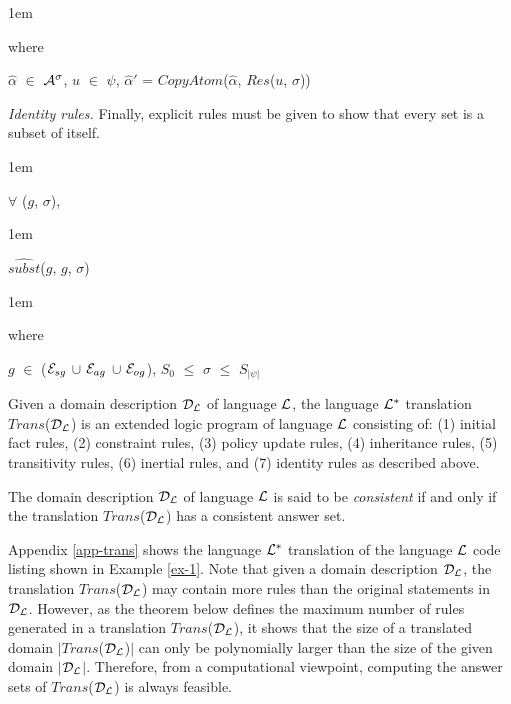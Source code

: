 \documentclass[glov2,twocolumn,final]{svjour2}
\newenvironment{vdefinition}
  {\begin{definition}\hspace{0.1em}}
  {\end{definition}}
\newenvironment{vquote}
  {\begin{list}{}{\leftmargin 1em}\item[]}
  {\end{list}}
\begin{document}
\begin{itemize}
              \begin{vquote}
                where

                $\hat{\alpha}$ $\in$ ${\cal A}^{\sigma}$,
                $u$ $\in$ $\psi$,
                $\hat{\alpha}'$ = $CopyAtom$($\hat{\alpha}$, $Res$($u$, $\sigma$))
              \end{vquote}
            \item
              {\em Identity rules.}
              Finally, explicit rules must be given to show that every set is
              a subset of itself.

              \begin{vquote}
                $\forall$ ($g$, $\sigma$),
              \end{vquote}

              \begin{vquote}
                $\hat{subst}$($g$, $g$, $\sigma$)
              \end{vquote}

              \begin{vquote}
                where

                $g$ $\in$ (${\cal E}_{sg}$ $\cup$ ${\cal E}_{ag}$ $\cup$ ${\cal E}_{og}$),
                $S_{0}$ $\leq$ $\sigma$ $\leq$ $S_{|\psi|}$
              \end{vquote}
          \end{itemize}

        \begin{vdefinition}
          \label{def-trans}
          Given a domain description ${\cal D_{L}}$ of language ${\cal L}$, the
          language ${\cal L^{*}}$ translation $Trans$(${\cal D_{L}}$) is an
          extended logic program of language ${\cal L}$ consisting of: (1)
          initial fact rules, (2) constraint rules, (3) policy update rules,
          (4) inheritance rules, (5) transitivity rules, (6) inertial rules,
          and (7) identity rules as described above.

          The domain description ${\cal D_{L}}$ of language ${\cal L}$ is said
          to be {\em consistent} if and only if the translation
          $Trans$(${\cal D_{L}}$) has a consistent answer set.
        \end{vdefinition}

        Appendix \ref{app-trans} shows the language ${\cal L^{*}}$ translation
        of the language ${\cal L}$ code listing shown in Example \ref{ex-1}.
        Note that given a domain description ${\cal D_{L}}$, the translation
        $Trans$(${\cal D_{L}}$) may contain more rules than the original
        statements in ${\cal D_{L}}$. However, as the theorem below defines the
        maximum number of rules generated in a translation
        $Trans$(${\cal D_{L}}$), it shows that the size of a translated domain
        $|$$Trans$(${\cal D_{L}}$)$|$ can only be polynomially larger than the
        size of the given domain $|$${\cal D_{L}}$$|$. Therefore, from a
        computational viewpoint, computing the answer sets of
        $Trans$(${\cal D_{L}}$) is always feasible.
\end{document}
